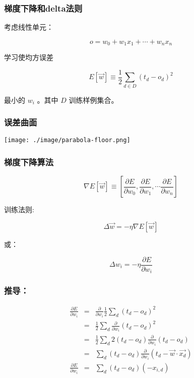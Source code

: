 \documentclass{beamer}
\begin{document}
\begin{frame}
\frametitle{梯度下降和delta法则}
\label{sec-2-5}


考虑线性单元：

\[ o = w_{0} + w_{1}x_1 + \cdots + w_n x_n \]

学习使均方误差

\[ E[\vec{w}] \equiv  \frac{1}{2}\sum_{d \in D}(t_{d} - o_{d})^{2} \]

最小的  $w_{i}$ 。其中 $D$ 训练样例集合。
\end{frame}
\begin{frame}
\frametitle{误差曲面}
\label{sec-2-6}

\center
\texttt{[image: ./image/parabola-floor.png]}
\end{frame}
\begin{frame}
\frametitle{梯度下降算法}
\label{sec-2-7}


\[ \nabla E[\vec{w}] \equiv \left[\frac{\partial E}{\partial w_{0}},
\frac{\partial E}{\partial w_{1}}, \cdots \frac{\partial E}{\partial
w_{n}}\right] \]

训练法则:

\[\Delta \vec{w} = -\eta \nabla E[\vec{w}] \]

或：

\[\Delta w_{i} = -\eta  \frac{\partial E}{\partial w_{i}}\]
\end{frame}
\begin{frame}
\frametitle{推导：}
\label{sec-2-8}


\begin{eqnarray}
\frac{\partial E}{\partial w_{i}} & = & \frac{\partial}{\partial w_{i}} \frac{1}{2}\sum_{d}(t_{d} - o_{d})^{2} \nonumber\\
 & = & \frac{1}{2}\sum_{d}\frac{\partial}{\partial w_{i}}
  (t_{d} - o_{d})^{2} \nonumber\\
 & = & \frac{1}{2}\sum_{d} 2 (t_{d} - o_{d}) 
\frac{\partial}{\partial w_{i}}(t_{d} - o_{d}) \nonumber\\
 & = & \sum_{d} (t_{d} - o_{d}) 
\frac{\partial}{\partial w_{i}}(t_{d} - \vec{w} \cdot \vec{x_{d}}) \nonumber\\
\frac{\partial E}{\partial w_{i}} & = & \sum_{d} (t_{d} - o_{d}) (- x_{i,d}) \nonumber
\end{eqnarray}
\end{frame}
\end{document}
